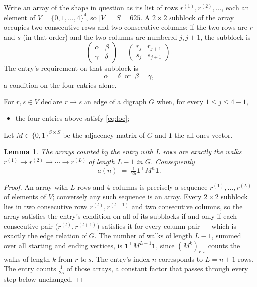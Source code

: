 \documentclass[11pt,a4paper]{article}
\theoremstyle{plain}
\newtheorem{lemma}[theorem]{Lemma}
\theoremstyle{definition}
\begin{document}
Write an array of the shape in question as its list of rows
$r^{(1)},r^{(2)},\dots$, each an element of
$V=\{0,1,\dots,4\}^{4}$, so $|V|=S=625$. A $2\times2$ subblock of the array
occupies two consecutive rows and two consecutive columns; if the two rows are $r$
and $s$ (in that order) and the two columns are numbered $j,j+1$,
the subblock is
\[
\begin{pmatrix}\alpha&\beta\\\gamma&\delta\end{pmatrix}=\begin{pmatrix}r_j&r_{j+1}\\s_j&s_{j+1}\end{pmatrix}.
\]
The entry's requirement on that subblock is
\begin{equation}\label{eq:loc}
\alpha=\delta\ \text{ or }\ \beta=\gamma,
\end{equation}
a condition on the four entries alone.

For $r,s\in V$ declare $r\to s$ an edge of a digraph $G$ when, for every
$1\le j\le 4-1$,
\begin{itemize}
\item the four entries above satisfy \eqref{eq:loc};

\end{itemize}
Let $M\in\{0,1\}^{S\times S}$ be the adjacency matrix of $G$ and $\mathbf{1}$ the
all-ones vector.

\begin{lemma}\label{lem:walk}
The arrays counted by the entry with $L$ rows are exactly the walks
$r^{(1)}\to r^{(2)}\to\cdots\to r^{(L)}$ of length $L-1$ in $G$. Consequently
\[
a(n)\;=\;\tfrac1{25}\mathbf{1}^{\!\top}M^{n}\mathbf{1} .
\]
\end{lemma}

\begin{proof}
An array with $L$ rows and $4$ columns is precisely a sequence
$r^{(1)},\dots,r^{(L)}$ of elements of $V$; conversely any such sequence is an array.
Every $2\times2$ subblock lies in two consecutive rows $r^{(t)},r^{(t+1)}$ and two
consecutive columns, so the array satisfies the entry's condition on all of its subblocks
if and only if each consecutive pair $\bigl(r^{(t)},r^{(t+1)}\bigr)$ satisfies it for
every column pair --- which is exactly the edge relation of $G$. The number of walks of
length $L-1$, summed over all starting and ending vertices, is
$\mathbf{1}^{\!\top}M^{L-1}\mathbf{1}$, since $(M^{k})_{r,s}$ counts the walks of
length $k$ from $r$ to $s$. The entry's index $n$ corresponds to $L=n+1$ rows. The entry counts $\tfrac1{25}$ of those arrays, a constant factor that passes through every step below unchanged.
\end{proof}
\end{document}

